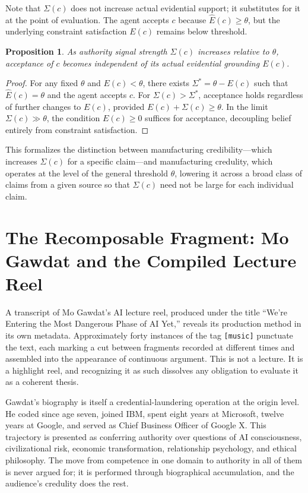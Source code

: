 \documentclass[12pt, a4paper]{article}
\newtheorem{proposition}[definition]{Proposition}
\begin{document}
Note that $\Sigma(c)$ does not increase actual evidential support; it substitutes for it at the
point of evaluation. The agent accepts $c$ because $\hat{E}(c) \ge \theta$, but the underlying
constraint satisfaction $E(c)$ remains below threshold.

\begin{proposition}
As authority signal strength $\Sigma(c)$ increases relative to $\theta$, acceptance of $c$ becomes
independent of its actual evidential grounding $E(c)$.
\end{proposition}

\begin{proof}
For any fixed $\theta$ and $E(c) < \theta$, there exists $\Sigma^* = \theta - E(c)$ such that
$\hat{E}(c) = \theta$ and the agent accepts $c$. For $\Sigma(c) > \Sigma^*$, acceptance holds
regardless of further changes to $E(c)$, provided $E(c) + \Sigma(c) \ge \theta$. In the limit
$\Sigma(c) \gg \theta$, the condition $E(c) \ge 0$ suffices for acceptance, decoupling belief
entirely from constraint satisfaction.
\end{proof}

This formalizes the distinction between manufacturing credibility---which increases $\Sigma(c)$ for
a specific claim---and manufacturing credulity, which operates at the level of the general
threshold $\theta$, lowering it across a broad class of claims from a given source so that
$\Sigma(c)$ need not be large for each individual claim.

\section{The Recomposable Fragment: Mo Gawdat and the Compiled Lecture Reel}

A transcript of Mo Gawdat's AI lecture reel, produced under the title ``We're Entering the Most
Dangerous Phase of AI Yet,'' reveals its production method in its own metadata. Approximately forty
instances of the tag \texttt{[music]} punctuate the text, each marking a cut between fragments
recorded at different times and assembled into the appearance of continuous argument. This is not a
lecture. It is a highlight reel, and recognizing it as such dissolves any obligation to evaluate
it as a coherent thesis.

Gawdat's biography is itself a credential-laundering operation at the origin level. He coded since
age seven, joined IBM, spent eight years at Microsoft, twelve years at Google, and served as Chief
Business Officer of Google X. This trajectory is presented as conferring authority over questions
of AI consciousness, civilizational risk, economic transformation, relationship psychology, and
ethical philosophy. The move from competence in one domain to authority in all of them is never
argued for; it is performed through biographical accumulation, and the audience's credulity does
the rest.
\end{document}
